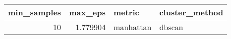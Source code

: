 \begin{tabular}{rrll}
\toprule
min_samples & max_eps & metric & cluster_method \\
\midrule
10 & 1.779904 & manhattan & dbscan \\
\bottomrule
\end{tabular}
